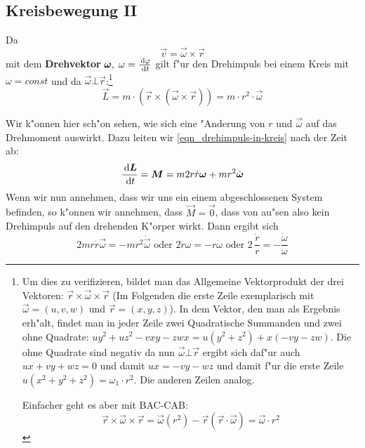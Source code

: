 \subsection{Kreisbewegung II}
\label{kap_kreisbewegung-ii}

Da
 $$\vec v = \vec \omega \times \vec r$$
mit dem \textbf{Drehvektor}
$\boldsymbol{\omega},\; \omega = \frac{\, \mathrm{d} \varphi}{\, \mathrm{d} t}$ gilt f"ur den Drehimpuls bei einem
Kreis mit $\omega =
const$ und da $\vec \omega \bot \vec r$:\footnote{Um dies zu
  verifizieren, bildet man das Allgemeine Vektorprodukt der drei
  Vektoren: $\vec r \times \vec \omega \times \vec r $ (Im Folgenden
  die erste Zeile exemplarisch mit $\vec \omega = (u, v, w)$ und $\vec r
  = (x, y, z)$). In dem Vektor, den man als Ergebnis
  erh"alt, findet man in jeder Zeile zwei Quadratische Summanden und
  zwei ohne Quadrate: $uy^2 + uz^2 - vxy - zwx = u(y^2 + z^2) + x(-vy
  -zw)$. Die ohne Quadrate sind negativ
  da nun $\vec \omega \bot \vec r$ ergibt sich daf"ur auch
  $ux + vy + wz = 0$ und damit $ux = -vy -wz$ und damit f"ur die erste
  Zeile $u(x^2 + y^2 + z^2) = \omega_1 \cdot r^2$. Die anderen Zeilen
  analog.

Einfacher geht es aber mit BAC-CAB:
$$
\vec r \times \vec \omega \times \vec r = \vec \omega (r^2) - \vec
r(\vec r\cdot\vec \omega) = \vec\omega \cdot r^2
$$}
\begin{equation}
   \label{eqn_drehimpuls-in-kreis}
   \vec L = m \cdot ( \vec r \times (\vec \omega \times \vec r) ) = m
   \cdot r^2 \cdot \vec \omega
\end{equation}

Wir k"onnen hier sch"on sehen, wie sich eine "Anderung von $r$ und $\vec
\omega$ auf das Drehmoment auswirkt. Dazu leiten wir
\eqref{eqn_drehimpuls-in-kreis} nach der Zeit ab:
\begin{equation}
   \label{eqn_differenz-c9}
   \frac{\, \mathrm{d} \boldsymbol{L}}{\, \mathrm{d} t } = \boldsymbol{M} = m 2r \dot r \boldsymbol{\omega} + m r^2
   \dot{\boldsymbol{\omega}}
\end{equation}
Wenn wir nun annehmen, dass wir uns ein einem abgeschlossenen System
befinden, so k"onnen wir annehmen, dass $\vec M = \vec 0$, dass von
au"sen also kein Drehimpuls auf den drehenden K"orper wirkt. Dann ergibt
sich
\begin{equation}
   \label{eq:30}
   2mr\dot r \vec \omega = - m r^2 \dot{\vec{\omega}} \text{ oder }
2\dot r \omega = -  r \dot\omega \text{ oder }
2\, \frac{\dot r}{r} = - \frac{\dot\omega}{\omega}
\end{equation}

